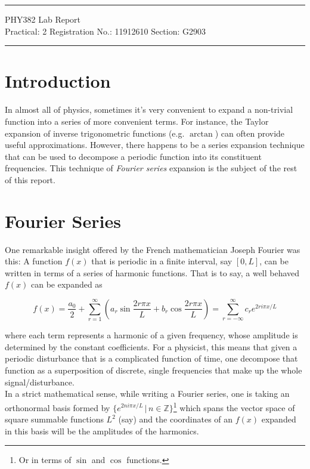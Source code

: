 \documentclass{article}
\begin{document}
	
	\author{Aayush Arya}
	\date{(Submitted: \today)}
	\title{}
	
	\maketitle
	
	\hrule
	\begin{center}
		PHY382 Lab Report\\
		Practical: 2 \quad Registration No.: 11912610 \quad Section: G2903
	\end{center}
	\hrule
	
	\section*{Introduction}
	In almost all of physics, sometimes it's very convenient to expand a non-trivial function into a series of more convenient terms. For instance, the Taylor expansion of inverse trigonometric functions (e.g. $\arctan$) can often provide useful approximations. However, there happens to be a series expansion technique that can be used to decompose a periodic function into its constituent frequencies. This technique of {\it Fourier series} expansion is the subject of the rest of this report.
	
	\section*{Fourier Series}
	One remarkable insight offered by the French mathematician Joseph Fourier was this: A function $f(x)$ that is periodic in a finite interval, say $[0, L]$, can be written in terms of a series of harmonic functions. That is to say, a well behaved $f(x)$ can be expanded as
	
	$$ f(x) = \frac{a_0}{2} + \sum_{r=1}^{\infty} \left(a_r \sin \frac{2r\pi x}{L} + b_r \cos \frac{2r\pi x}{L} \right) = \sum_{r=-\infty}^{\infty} c_r e^{2ri\pi x/L}$$
	
	where each term represents a harmonic of a given frequency, whose amplitude is determined by the constant coefficients. For a physicist, this means that given a periodic disturbance that is  a complicated function of time, one decompose that function as a superposition of discrete, single frequencies that make up the whole signal/disturbance.\\
	
	In a strict mathematical sense, while writing a Fourier series, one is taking an orthonormal basis formed by $\{e^{2ni\pi x/L} \hspace{2pt} | \hspace{2pt} n\in \mathbb{Z}\}$\footnote{Or in terms of $\sin$ and $\cos$ functions.} which spans the vector space of square summable functions $L^2$ (say) and the coordinates of an $f(x)$ expanded in this basis will be the amplitudes of the harmonics.\\
	
\end{document}
